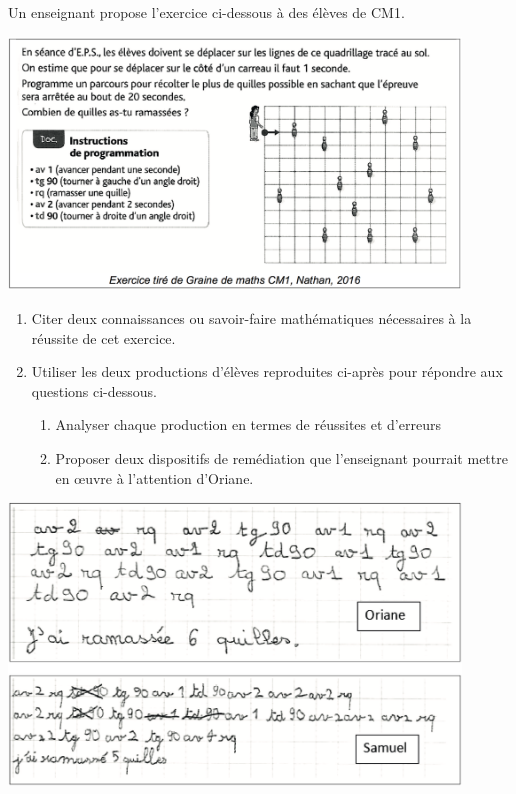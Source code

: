 \begin{exercice}[CRPE 2017 G3]
Un enseignant propose l’exercice ci-dessous à des élèves de CM1.

\begin{center}
   \includegraphics[width=12cm]{Geometrie_did/Images/Geo6_analyse_programmation}
\end{center}

\begin{enumerate}
   \item Citer deux connaissances ou savoir-faire mathématiques nécessaires à la réussite de cet exercice.
   \item Utiliser les deux productions d’élèves reproduites ci-après pour répondre aux questions ci-dessous.
   \begin{enumerate}
      \item Analyser chaque production en termes de réussites et d’erreurs
      \item Proposer deux dispositifs de remédiation que l’enseignant pourrait mettre en œuvre à l’attention d’Oriane.
   \end{enumerate}
\end{enumerate}

\begin{center}
   \includegraphics[width=12cm]{Geometrie_did/Images/Geo6_analyse_programmation_eleves}
\end{center}
\end{exercice}

